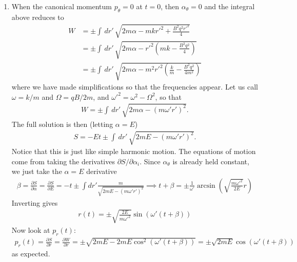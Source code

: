\documentclass{article}
\theoremstyle{definition}
\newcommand{\p}{\partial}
\newcommand{\al}{\alpha}
\newcommand{\be}{\beta}
\newcommand{\f}[2]{\frac{#1}{#2}}
\newcommand{\lp}{\left(}
\newcommand{\rp}{\right)}
\begin{document}
\begin{enumerate}[label=(\alph*)]
	
	\item When the canonical momentum $p_\theta = 0$ at $t=0$, then $\al_\theta = 0$ and the integral above reduces to 
	\begin{align*}
	{W} &= \pm \int \,dr' \, \sqrt{2m\al - mkr'^2 + \f{B^2q^2r'^2}{4} } \\
	&= {\pm \int \,dr' \, \sqrt{2m\al - r'^2\lp mk - \f{B^2q^2}{4} \rp }}\\
	&= \pm \int \,dr' \, \sqrt{2m\al - m^2r'^2\lp \f{k}{m} - \f{B^2q^2}{4m^2} \rp }
	\end{align*}
	where we have made simplifications so that the frequencies appear. Let us call $\omega = k/m$ and $\Omega = qB/2m$, and $\omega'^2 = \omega^2 - \Omega^2$, so that
	\begin{align*}
	W = \pm \int \,dr' \, \sqrt{2m\al - (m\omega'r')^2 }.
	\end{align*}
	The full solution is then (letting $\al = E$)
	\begin{align*}
	S = -Et \pm \int \,dr' \, \sqrt{2mE - (m\omega'r')^2  }.
	\end{align*}
	Notice that this is just like simple harmonic motion. The equations of motion come from taking the derivatives $\p S/\p \al_i$. Since $\al_\theta$ is already held constant, we just take the $\al=E$ derivative
	\begin{align*}
	\be = \f{\p S}{\p \al} = \f{\p S}{\p E} = -t \pm \int dr' \f{m}{\sqrt{2mE -  (m\omega'r')^2}} \implies 
	t + \be = \pm \f{1}{\omega'}\arcsin\lp \sqrt{\f{m\omega'^2}{2E}} r\rp 
	\end{align*}
	Inverting gives
	\begin{align*}
	\boxed{r(t) = \pm \sqrt{\f{2E}{m\omega'^2}}\sin(\omega'(t+\be))}
	\end{align*}
	Now look at $p_r(t)$:
	\begin{align*}
	\boxed{p_r(t)} = \f{\p S}{\p r} = \f{\p W}{\p r} = \pm \sqrt{2mE - 2mE\cos^2(\omega'(t+\be))} = 
	\boxed{\pm \sqrt{2mE} \cos(\omega'(t+\be))}
	\end{align*}
	as expected.
\end{enumerate}
\end{document}
